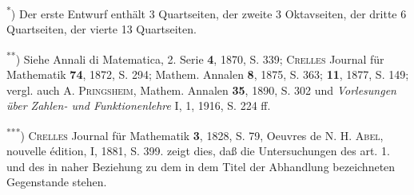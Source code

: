 \noindent\hspace*{\parindent}\textsuperscript{*}) Der erste Entwurf enthält 3 Quartseiten, der zweite 3 Oktavseiten, der dritte 6 Quartseiten, der vierte 13 Quartseiten.
\par\noindent\hspace*{\parindent}\textsuperscript{**}) Siehe Annali di Matematica, 2. Serie \textbf{4}, 1870, S. 339; \textsc{Crelles} Journal für Mathematik \textbf{74}, 1872, S. 294; Mathem. Annalen \textbf{8}, 1875, S. 363; \textbf{11}, 1877, S. 149; vergl. auch A. \textsc{Pringsheim}, Mathem. Annalen \textbf{35}, 1890, S. 302 und \textit{Vorlesungen über Zahlen- und Funktionenlehre} I, 1, 1916, S. 224 ff.
\par\noindent\hspace*{\parindent}\textsuperscript{***}) \textsc{Crelles} Journal für Mathematik \textbf{3}, 1828, S. 79, Oeuvres de N. H. \textsc{Abel}, nouvelle édition, I, 1881, S. 399.
\clearpage{}
\noindent zeigt dies, daß die Untersuchungen des art. 1. und des  in naher Beziehung zu dem in dem Titel der Abhandlung bezeichneten Gegenstande stehen.

